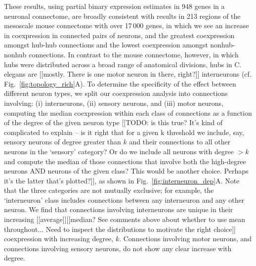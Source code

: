\documentclass[10pt,letterpaper]{article}
\begin{document}
These results, using partial binary expression estimates in 948 genes in a neuronal connectome, are broadly consistent with results in 213 regions of the mesoscale mouse connectome with over 17\,000 genes, in which we see an increase in coexpression in connected pairs of neurons, and the greatest coexpression amongst hub-hub connections and the lowest coexpression amongst nonhub-nonhub connections.
In contrast to the mouse connectome, however, in which hubs were distributed across a broad range of anatomical divisions, hubs in C. elegans are [[mostly. There is one motor neuron in there, right?]] interneurons \cite{Towlson:2013gf} (cf. Fig.~\ref{fig:topology_rich}A).
To determine the specificity of the effect between different neuron types, we split our coexpression analysis into connections involving: (i) interneurons, (ii) sensory neurons, and (iii) motor neurons, computing the median coexpression within each class of connections as a function of the degree of the given neuron type [[TODO: is this true? It's kind of complicated to explain -- is it right that for a given k threshold we include, say, sensory neurons of degree greater than $k$ and their connections to all other neurons in the `sensory' category? Or do we include all neurons with degree $>k$ and compute the median of those connections that involve both the high-degree neurons AND neurons of the given class? This would be another choice. Perhaps it's the latter that's plotted?]], as shown in Fig.~\ref{fig:interneuron_dep}A.
Note that the three categories are not mutually exclusive; for example, the `interneuron' class includes connections between any interneuron and any other neuron.
We find that connections involving interneurons are unique in their increasing [[average]][[median? See comments above about whether to use mean throughout... Need to inspect the distributions to motivate the right choice]] coexpression with increasing degree, $k$.
Connections involving motor neurons, and connections involving sensory neurons, do not show any clear increase with degree.
\end{document}
